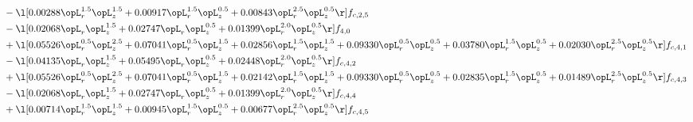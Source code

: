 \begin{alignat}{2}
& - \l[  0.00288 \opL_r^{1.5} \opL_z^{1.5} +  0.00917 \opL_r^{1.5} \opL_z^{0.5} +  0.00843 \opL_r^{2.5} \opL_z^{0.5}  \r] f_{c,2,5} \nonumber \\ 
& - \l[  0.02068 \opL_r \opL_z^{1.5} +  0.02747 \opL_r \opL_z^{0.5} +  0.01399 \opL_r^{2.0} \opL_z^{0.5}  \r] f_{4,0} \nonumber \\ 
& + \l[  0.05526 \opL_r^{0.5} \opL_z^{2.5} +  0.07041 \opL_r^{0.5} \opL_z^{1.5} +  0.02856 \opL_r^{1.5} \opL_z^{1.5} +  0.09330 \opL_r^{0.5} \opL_z^{0.5} +  0.03780 \opL_r^{1.5} \opL_z^{0.5} +  0.02030 \opL_r^{2.5} \opL_z^{0.5}  \r] f_{c,4,1} \nonumber \\ 
& - \l[  0.04135 \opL_r \opL_z^{1.5} +  0.05495 \opL_r \opL_z^{0.5} +  0.02448 \opL_r^{2.0} \opL_z^{0.5}  \r] f_{c,4,2} \nonumber \\ 
& + \l[  0.05526 \opL_r^{0.5} \opL_z^{2.5} +  0.07041 \opL_r^{0.5} \opL_z^{1.5} +  0.02142 \opL_r^{1.5} \opL_z^{1.5} +  0.09330 \opL_r^{0.5} \opL_z^{0.5} +  0.02835 \opL_r^{1.5} \opL_z^{0.5} +  0.01489 \opL_r^{2.5} \opL_z^{0.5}  \r] f_{c,4,3} \nonumber \\ 
& - \l[  0.02068 \opL_r \opL_z^{1.5} +  0.02747 \opL_r \opL_z^{0.5} +  0.01399 \opL_r^{2.0} \opL_z^{0.5}  \r] f_{c,4,4} \nonumber \\ 
& + \l[  0.00714 \opL_r^{1.5} \opL_z^{1.5} +  0.00945 \opL_r^{1.5} \opL_z^{0.5} +  0.00677 \opL_r^{2.5} \opL_z^{0.5}  \r] f_{c,4,5} \nonumber \\ 
\end{alignat} 


